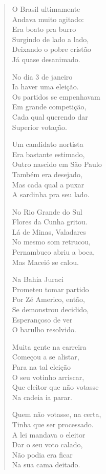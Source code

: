 \begin{verse}
O Brasil ultimamente\\
Andava muito agitado:\\
Era boato pra burro\\
Surgindo de lado a lado,\\
Deixando o pobre cristão\\
Já quase desanimado.

No dia 3 de janeiro\\
Ia haver uma eleição.\\
Os partidos se empenhavam\\
Em grande competição,\\
Cada qual querendo dar\\
Superior votação.

Um candidato nortista\\
Era bastante estimado,\\
Outro nascido em São Paulo\\
Também era desejado,\\
Mas cada qual a puxar\\
A sardinha pra seu lado.
\pagebreak

No Rio Grande do Sul\\
Flores da Cunha gritou.\\
Lá de Minas, Valadares\\
No mesmo som retrucou,\\
Pernambuco abriu a boca,\\
Mas Maceió se calou. 

Na Bahia Juraci\\
Prometeu tomar partido\\
Por Zé Americo, então,\\
Se demonstrou decidido,\\
Esperançoso de ver\\
O barulho resolvido.

Muita gente na carreira\\
Começou a se alistar,\\
Para na tal eleição\\
O seu votinho arriscar,\\
Que eleitor que não votasse\\
Na cadeia ia parar.

Quem não votasse, na certa, \\
Tinha que ser processado.\\
A lei mandava o eleitor\\
Dar o seu voto calado,\\
Não podia era ficar\\
Na sua cama deitado.
\pagebreak


\end{verse}
